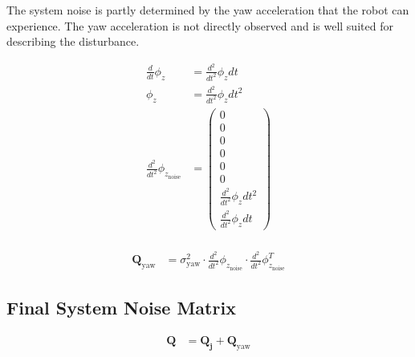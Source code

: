 \documentclass{article}
\begin{document}
The system noise is partly determined by the yaw acceleration that the robot can experience. The yaw acceleration is not directly observed and is well suited for describing the disturbance.

\begin{align}
  \frac{d}{dt}\phi_z &= \frac{d^2}{dt^2}\phi_z dt \\
  \phi_z &= \frac{d^2}{dt^2}\phi_z dt^{2} \\
  \frac{d^2}{dt^2}\phi_{z_\textrm{noise}} &= \left(\begin{matrix}0\\0\\0\\0\\0\\0\\\frac{d^2}{dt^2}\phi_z dt^{2}\\\frac{d^2}{dt^2}\phi_z dt\end{matrix}\right) \\
\end{align}

\begin{align}
  \textbf{Q}_{\textrm{yaw}} &= \sigma^2_{\textrm{yaw}} \cdot \frac{d^2}{dt^2}\phi_{z_\textrm{noise}} \cdot \frac{d^2}{dt^2} \phi_{z_\textrm{noise}}^T
\end{align}

\subsection{Final System Noise Matrix}

\begin{align}
  \textbf{Q} &= \textbf{Q}_{\textbf{j}} + \textbf{Q}_{\textrm{yaw}}
\end{align}
\end{document}
